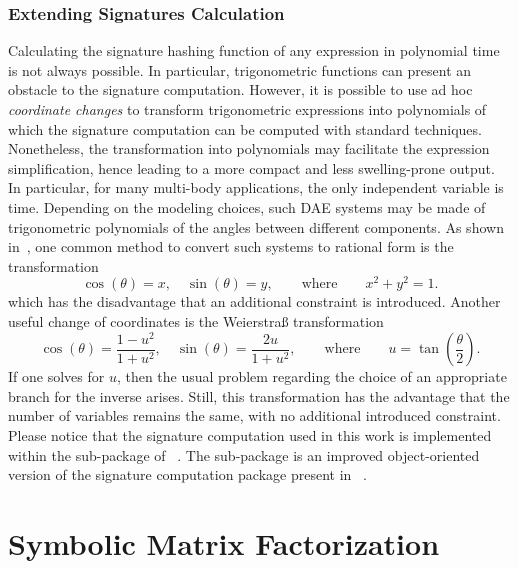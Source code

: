 \subsubsection{Extending Signatures Calculation}

Calculating the signature hashing function of any expression in polynomial time is not always possible. In particular, trigonometric functions can present an obstacle to the signature computation. However, it is possible to use ad hoc \emph{coordinate changes} to transform trigonometric expressions into polynomials of which the signature computation can be computed with standard techniques. Nonetheless, the transformation into polynomials may facilitate the expression simplification, hence leading to a more compact and less swelling-prone output. In particular, for many multi-body applications, the only independent variable is time. Depending on the modeling choices, such \ac{DAE} systems may be made of trigonometric polynomials of the angles between different components. As shown in~\cite{zhou2005implicit}, one common method to convert such systems to rational form is the transformation
%
\begin{equation}
  \label{chap2:eq:zhou}
  \cos(\theta) = x, \quad
  \sin(\theta) = y,
  \qquad \text{where} \qquad
  x^2 + y^2 = 1.
\end{equation}
%
which has the disadvantage that an additional constraint is introduced. Another useful change of coordinates is the Weierstra{\ss} transformation~\cite{cox1994ideals}
%
\begin{equation}
  \label{chap2:eq:weierstrass}
  \cos(\theta) = \dfrac{1 - u^2}{1 + u^2}, \quad
  \sin(\theta) = \dfrac{2u}{1 + u^2},
  \qquad \text{where} \qquad
  u = \tan\left(\dfrac{\theta}{2}\right).
\end{equation}
%
If one solves for $u$, then the usual problem regarding the choice of an appropriate branch for the inverse arises. Still, this transformation has the advantage that the number of variables remains the same, with no additional introduced constraint. Please notice that the signature computation used in this work is implemented within the \SIG{} sub-package of \LEM{}~\cite{lem}. The \SIG{} sub-package is an improved object-oriented version of the signature computation package present in \LULEM{}~\cite{carette2006linear}.


\section{Symbolic Matrix Factorization}
\label{chap2:sec:last}

